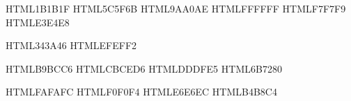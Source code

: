 %

\definecolor{ink}        {HTML}{1B1B1F}  %
\definecolor{inkmuted}   {HTML}{5C5F6B}  %
\definecolor{inkfaint}   {HTML}{9AA0AE}  %
\definecolor{paper}      {HTML}{FFFFFF}
\definecolor{papersoft}  {HTML}{F7F7F9}  %
\definecolor{rule}       {HTML}{E3E4E8}  %

\definecolor{accent}     {HTML}{343A46}  %
\definecolor{accentsoft} {HTML}{EFEFF2}

\definecolor{red}        {HTML}{B9BCC6}
\definecolor{yellow}     {HTML}{CBCED6}
\definecolor{green}      {HTML}{DDDFE5}
\definecolor{gray}       {HTML}{6B7280}

\definecolor{codebg}     {HTML}{FAFAFC}
\definecolor{codechrome} {HTML}{F0F0F4}  %
\definecolor{codeborder} {HTML}{E6E6EC}
\definecolor{codegutter} {HTML}{B4B8C4}
